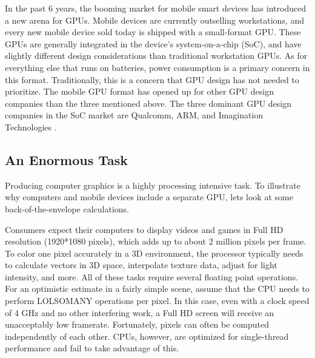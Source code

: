 \documentclass[../main/report.tex]{subfiles}
\begin{document}
In the past 6 years, the booming market for mobile smart devices has introduced a new arena for GPUs.
Mobile devices are currently outselling workstations, and every new mobile device sold today is shipped with a small-format GPU.
These GPUs are generally integrated in the device's system-on-a-chip (SoC), and have slightly different design considerations than traditional workstation GPUs.
As for everything else that runs on batteries, power consumption is a primary concern in this format.
Traditionally, this is a concern that GPU design has not needed to prioritize.
The mobile GPU format has opened up for other GPU design companies than the three mentioned above.
The three dominant GPU design companies in the SoC market are Qualcomm, ARM, and Imagination Technologies \cite{gpu_mobile_sales}.


\subsection{An Enormous Task}

Producing computer graphics is a highly processing intensive task.
To illustrate why computers and mobile devices include a separate GPU, lets look at some back-of-the-envelope calculations.

Consumers expect their computers to display videos and games in Full HD resolution (1920*1080 pixels), which adds up to about 2 million pixels per frame.
To color one pixel accurately in a 3D environment, the processor typically needs to calculate vectors in 3D space, interpolate texture data, adjust for light intensity, and more.
All of these tasks require several floating point operations.
For an optimistic estimate in a fairly simple scene, assume that the CPU needs to perform LOLSOMANY operations per pixel. 
In this case, even with a clock speed of 4 GHz and no other interfering work, a Full HD screen will receive an unacceptably low framerate.
Fortunately, pixels can often be computed independently of each other.
CPUs, however, are optimized for single-thread performance and fail to take advantage of this.
\end{document}
